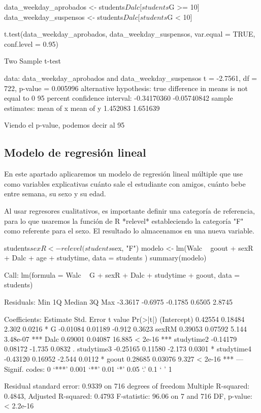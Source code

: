 \documentclass[12pt,a4paper]{article}
\begin{document}
\begin{spverbatim}
data_weekday_aprobados <- students$Dalc[students$G >= 10] 
data_weekday_suspensos <- students$Dalc[students$G < 10] 

t.test(data_weekday_aprobados, data_weekday_suspensos, var.equal = TRUE, conf.level = 0.95)

Two Sample t-test

data:  data_weekday_aprobados and data_weekday_suspensos
t = -2.7561, df = 722, p-value = 0.005996
alternative hypothesis: true difference in means is not equal to 0
95 percent confidence interval:
 -0.34170360 -0.05740842
sample estimates:
mean of x mean of y 
 1.452083  1.651639 
 
\end{spverbatim}
Viendo el p-value, podemos decir al 95%

\subsection{Modelo de regresión lineal}

En este apartado aplicaremos un modelo de regresión lineal múltiple que use como variables explicativas cuánto sale el estudiante con amigos, cuánto bebe entre semana, su sexo y su edad.

Al usar regresores cualitativos, es importante definir una categoría de referencia, para lo que usaremos la función de R *relevel* estableciendo la categoría "F" como referente para el sexo. El resultado lo almacenamos en una nueva variable.

\begin{spverbatim}
students$sexR <- relevel(students$sex, "F")
modelo <- lm(Walc ~ goout + sexR + Dalc + age + studytime, data = students )
summary(modelo)

Call:
lm(formula = Walc ~ G + sexR + Dalc + studytime + goout, data = students)

Residuals:
    Min      1Q  Median      3Q     Max 
-3.3617 -0.6975 -0.1785  0.6505  2.8745 

Coefficients:
            Estimate Std. Error t value Pr(>|t|)    
(Intercept)  0.42554    0.18484   2.302   0.0216 *  
G           -0.01084    0.01189  -0.912   0.3623    
sexRM        0.39053    0.07592   5.144 3.48e-07 ***
Dalc         0.69001    0.04087  16.885  < 2e-16 ***
studytime2  -0.14179    0.08172  -1.735   0.0832 .  
studytime3  -0.25165    0.11580  -2.173   0.0301 *  
studytime4  -0.43120    0.16952  -2.544   0.0112 *  
goout        0.28685    0.03076   9.327  < 2e-16 ***
---
Signif. codes:  0 ‘***’ 0.001 ‘**’ 0.01 ‘*’ 0.05 ‘.’ 0.1 ‘ ’ 1

Residual standard error: 0.9339 on 716 degrees of freedom
Multiple R-squared:  0.4843,	Adjusted R-squared:  0.4793 
F-statistic: 96.06 on 7 and 716 DF,  p-value: < 2.2e-16

\end{spverbatim}
\end{document}
